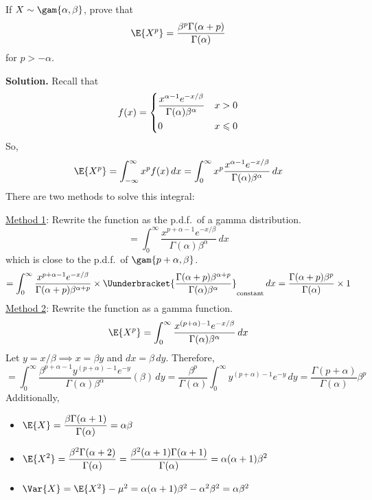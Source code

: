 \begin{Example}{}{}
    If $ X \sim \gam{\alpha,\beta}$, prove that
    \[ \E{X^p}=\frac{\beta^p\Gamma(\alpha+p)}{\Gamma(\alpha)}  \]
    for $ p>-\alpha $.

    \textbf{Solution.} Recall that
    \[ f(x)=\begin{dcases}
            \frac{x^{\alpha-1}e^{-x/\beta}}{\Gamma(\alpha)\beta^\alpha} & x>0          \\
            0                                                           & x\leqslant 0
        \end{dcases} \]
    So,
    \[ \E{X^p}=\int_{-\infty}^{\infty} x^p f(x)\, d{x}
        =\int_{0}^{\infty} x^p \frac{x^{\alpha-1}e^{-x/\beta}}{\Gamma(\alpha)\beta^\alpha}\, d{x}
    \]
    There are two methods to solve this integral:

    \underline{Method 1}: Rewrite the function as the p.d.f.\ of a gamma
    distribution.
    \[ =\int_{0}^{\infty} \frac{x^{p+\alpha-1}e^{-x/\beta}}{\Gamma(\alpha)\beta^\alpha} \, d{x}  \]
    which is close to the p.d.f.\ of $ \gam{p+\alpha,\beta}$.
    \[ =\int_{0}^{\infty} \frac{x^{p+\alpha-1}e^{-x/\beta}}{\Gamma(\alpha+p)\beta^{\alpha+p}}\times
        \Uunderbracket{\frac{\Gamma(\alpha+p)\beta^{\alpha+p}}{\Gamma(\alpha)\beta^\alpha}}_{\text{constant}}  \, d{x}=
        \frac{\Gamma(\alpha+p)\beta^p}{\Gamma(\alpha)}\times 1   \]
    \underline{Method 2}: Rewrite the function as a gamma function.
    \[ \E{X^p}=\int_{0}^{\infty} \frac{x^{(p+\alpha)-1} e^{-x/\beta}}{\Gamma(\alpha)\beta^\alpha} \, d{x} \]
    Let $ y=x/\beta \implies x=\beta y$ and $ dx=\beta\,dy $. Therefore,
    \[ =\int_{0}^{\infty} \frac{\beta^{p+\alpha-1}y^{(p+\alpha)-1}e^{-y}}{\Gamma(\alpha)\beta^\alpha} (\beta)\, d{y}
        =\frac{\beta^p}{\Gamma(\alpha)}\int_{0}^{\infty} y^{(p+\alpha)-1}e^{-y}\, d{y}
        =\frac{\Gamma(p+\alpha)}{\Gamma(\alpha)}\beta^p     \]
    Additionally,
    \begin{itemize}
        \item $ \displaystyle \E{X}= \frac{\beta\Gamma(\alpha+1)}{\Gamma(\alpha)} =\alpha\beta $
        \item $ \displaystyle \E{X^2}= \frac{\beta^2\Gamma(\alpha+2)}{\Gamma(\alpha)}=\frac{\beta^2(\alpha+1)\Gamma(\alpha+1)}{\Gamma(\alpha)}=
                  \alpha(\alpha+1)\beta^2   $
        \item $ \Var{X}=\E{X^2}-\mu^2=\alpha(\alpha+1)\beta^2-\alpha^2\beta^2=\alpha\beta^2 $
    \end{itemize}
\end{Example}
